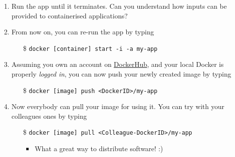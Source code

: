 \documentclass[presentation]{beamer}\mode<presentation>{\usetheme{AMSBolognaFC}}
\begin{document}
\begin{frame}[allowframebreaks]
\begin{enumerate}
        \item Run the app until it terminates. Can you understand how inputs can be provided to containerised applications?

        \framebreak

        \item From now on, you can re-run the app by typing
        \begin{itemize}
            \item[\$] \texttt{docker [container] \alert{start} -i -a my-app}
        \end{itemize}

        \item Assuming you own an account on \href{https://hub.docker.com/}{DockerHub}, and your local Docker is properly \emph{logged in}, you can now \alert{push} your newly created image by typing
        \begin{itemize}
            \item[\$] \texttt{docker [image] \alert{push} <DockerID>/my-app}
        \end{itemize}

        \item Now everybody can \alert{pull} your image for using it. You can try with your colleagues ones by typing
        \begin{itemize}
            \item[\$] \texttt{docker [image] \alert{pull} <Colleague-DockerID>/my-app}
            \begin{itemize}
                \item What a great way to distribute software! :)
            \end{itemize}
        \end{itemize}

    \end{enumerate}

\end{frame}

%
%
%
%
%
\end{document}
